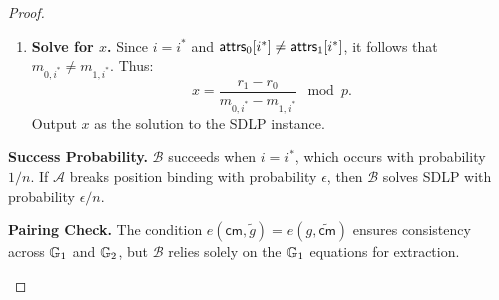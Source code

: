 \begin{proof}
\begin{enumerate}
\begin{enumerate}
        \item \textbf{Solve for $x$.} Since $i = i^*$ and $\mathsf{attrs}_0[i^*] \neq \mathsf{attrs}_1[i^*]$, it follows that $m_{0,i^*} \neq m_{1,i^*}$. Thus:
        $$x = \frac{r_1 - r_0}{m_{0,i^*} - m_{1,i^*}} \mod p.$$
        Output $x$ as the solution to the SDLP instance.
    \end{enumerate}

    \textbf{Success Probability.} $\mathcal{B}$ succeeds when $i = i^*$, which occurs with probability $1/n$. If $\mathcal{A}$ breaks position binding with probability $\epsilon$, then $\mathcal{B}$ solves SDLP with probability $\epsilon / n$.

\textbf{Pairing Check.} The condition $e(\mathsf{cm}, \tilde{g}) = e(g, \widetilde{\mathsf{cm}})$ ensures consistency across $\mathbb{G}_1$ and $\mathbb{G}_2$, but $\mathcal{B}$ relies solely on the $\mathbb{G}_1$ equations for extraction.
\end{enumerate}
\end{proof}





    
    
